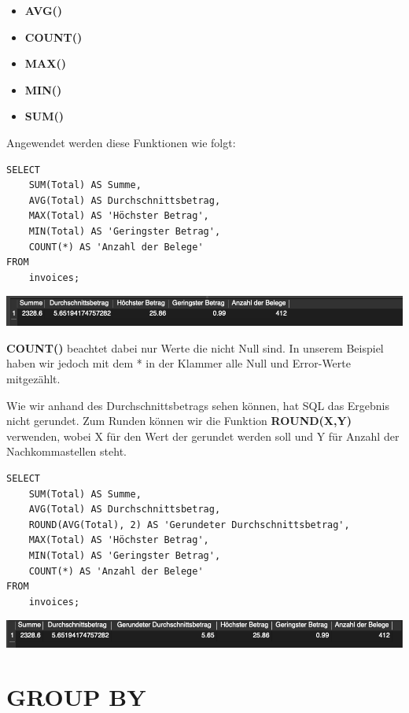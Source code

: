 \documentclass[
]{book}
\providecommand{\tightlist}{%
  \setlength{\itemsep}{0pt}\setlength{\parskip}{0pt}}
\begin{document}
\begin{itemize}
\tightlist
\item
  \textbf{AVG()}\\
\item
  \textbf{COUNT()}\\
\item
  \textbf{MAX()}\\
\item
  \textbf{MIN()}\\
\item
  \textbf{SUM()}
\end{itemize}

Angewendet werden diese Funktionen wie folgt:

\begin{verbatim}
SELECT
    SUM(Total) AS Summe,
    AVG(Total) AS Durchschnittsbetrag,
    MAX(Total) AS 'Höchster Betrag',
    MIN(Total) AS 'Geringster Betrag',
    COUNT(*) AS 'Anzahl der Belege'
FROM
    invoices;
\end{verbatim}

\includegraphics[width=10.41667in,height=\textheight]{img-FUNC1.png}

\textbf{COUNT()} beachtet dabei nur Werte die nicht Null sind. In unserem Beispiel haben wir jedoch mit dem * in der Klammer alle Null und Error-Werte mitgezählt.

Wie wir anhand des Durchschnittsbetrags sehen können, hat SQL das Ergebnis nicht gerundet. Zum Runden können wir die Funktion \textbf{ROUND(X,Y)} verwenden, wobei X für den Wert der gerundet werden soll und Y für Anzahl der Nachkommastellen steht.

\begin{verbatim}
SELECT
    SUM(Total) AS Summe,
    AVG(Total) AS Durchschnittsbetrag,
    ROUND(AVG(Total), 2) AS 'Gerundeter Durchschnittsbetrag',
    MAX(Total) AS 'Höchster Betrag',
    MIN(Total) AS 'Geringster Betrag',
    COUNT(*) AS 'Anzahl der Belege'
FROM
    invoices;
\end{verbatim}

\includegraphics[width=10.41667in,height=\textheight]{img-FUNC2.png}

\hypertarget{group-by}{%
\section{GROUP BY}\label{group-by}}
\end{document}

